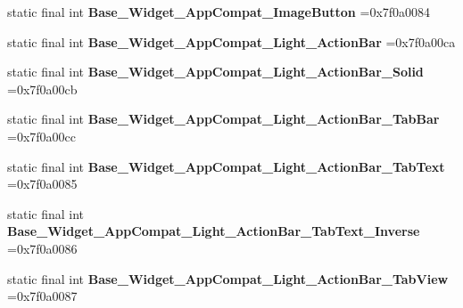\begin{DoxyCompactItemize}
\item 
\mbox{\label{classproject4_1_1xaria_1_1R_1_1style_adfb17ca63f0850580dfef2cfb45a150f}} 
static final int {\bfseries Base\+\_\+\+Widget\+\_\+\+App\+Compat\+\_\+\+Image\+Button} =0x7f0a0084
\item 
\mbox{\label{classproject4_1_1xaria_1_1R_1_1style_a86434acbd6090f6c6ddb801652ed2c6e}} 
static final int {\bfseries Base\+\_\+\+Widget\+\_\+\+App\+Compat\+\_\+\+Light\+\_\+\+Action\+Bar} =0x7f0a00ca
\item 
\mbox{\label{classproject4_1_1xaria_1_1R_1_1style_a2c4078103a606149d8054486ce4ba269}} 
static final int {\bfseries Base\+\_\+\+Widget\+\_\+\+App\+Compat\+\_\+\+Light\+\_\+\+Action\+Bar\+\_\+\+Solid} =0x7f0a00cb
\item 
\mbox{\label{classproject4_1_1xaria_1_1R_1_1style_af04e2b42cce83302bb7e55281aff5e6e}} 
static final int {\bfseries Base\+\_\+\+Widget\+\_\+\+App\+Compat\+\_\+\+Light\+\_\+\+Action\+Bar\+\_\+\+Tab\+Bar} =0x7f0a00cc
\item 
\mbox{\label{classproject4_1_1xaria_1_1R_1_1style_aeaa8d221346cb1fdf44ddcf6d59185d1}} 
static final int {\bfseries Base\+\_\+\+Widget\+\_\+\+App\+Compat\+\_\+\+Light\+\_\+\+Action\+Bar\+\_\+\+Tab\+Text} =0x7f0a0085
\item 
\mbox{\label{classproject4_1_1xaria_1_1R_1_1style_a9c310ae14eb0c2b1f2e53631ef4b10fc}} 
static final int {\bfseries Base\+\_\+\+Widget\+\_\+\+App\+Compat\+\_\+\+Light\+\_\+\+Action\+Bar\+\_\+\+Tab\+Text\+\_\+\+Inverse} =0x7f0a0086
\item 
\mbox{\label{classproject4_1_1xaria_1_1R_1_1style_a3f9b22a2afb03ce1a7ad46f949a08dd5}} 
static final int {\bfseries Base\+\_\+\+Widget\+\_\+\+App\+Compat\+\_\+\+Light\+\_\+\+Action\+Bar\+\_\+\+Tab\+View} =0x7f0a0087
\item 
\mbox{\label{classproject4_1_1xaria_1_1R_1_1style_ac6a7fb5982c721f12dd26141f6ef1200}} 

\end{DoxyCompactItemize}
